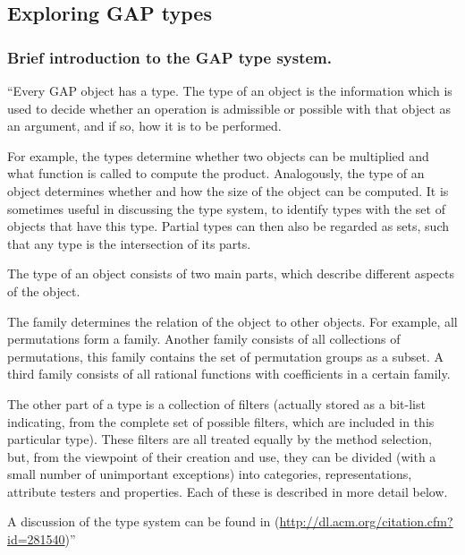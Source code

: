 \subsection{Exploring GAP types}

\subsubsection{Brief introduction to the GAP type system.}\label{gap-types-intro}


``Every GAP object has a type. The type of an object is the information 
which is used to decide whether an operation is admissible or possible 
with that object as an argument, and if so, how it is to be performed.

For example, the types determine whether two objects can be multiplied 
and what function is called to compute the product. Analogously, the 
type of an object determines whether and how the size of the object 
can be computed. It is sometimes useful in discussing the type system, 
to identify types with the set of objects that have this type. Partial 
types can then also be regarded as sets, such that any type is the 
intersection of its parts.

The type of an object consists of two main parts, which describe 
different aspects of the object.

The family determines the relation of the object to other objects. 
For example, all permutations form a family. Another family consists 
of all collections of permutations, this family contains the set of 
permutation groups as a subset. A third family consists of all 
rational functions with coefficients in a certain family.

The other part of a type is a collection of filters (actually stored 
as a bit-list indicating, from the complete set of possible filters, 
which are included in this particular type). These filters are all 
treated equally by the method selection, but, from the viewpoint of 
their creation and use, they can be divided (with a small number of 
unimportant exceptions) into categories, representations, attribute 
testers and properties. Each of these is described in more detail below.

A discussion of the type system can be found in \cite{breuer-linton}
(\url{http://dl.acm.org/citation.cfm?id=281540})''

